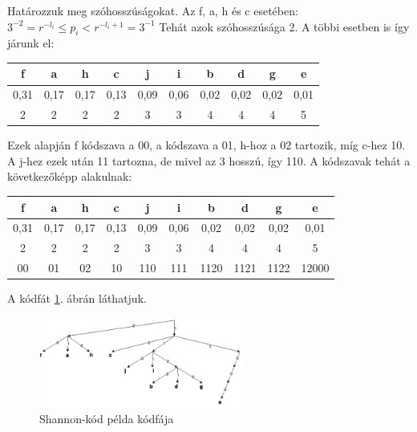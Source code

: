 \documentclass[margin=0px]{article}
\begin{document}
\begin{description}
					Határozzuk meg szóhosszúságokat. Az f, a, h és c esetében: $3^{-2} = r^{-l_i} \leq p_i < r^{-l_i+1} = 3^{-1} $ Tehát azok szóhosszúsága 2. A többi esetben is így járunk el:

					\begin{tabular}{|c|c|c|c|c|c|c|c|c|c|}
						\hline f & a & h & c & j & i & b & d & g & e \\ 
						\hline 0,31 & 0,17 & 0,17 & 0,13 & 0,09 & 0,06 & 0,02 & 0,02 & 0,02 & 0,01 \\ 
						\hline 2 & 2 & 2 & 2 & 3 & 3 & 4 & 4 & 4  & 5 \\
						\hline 
					\end{tabular}
					
					Ezek alapján f kódszava a 00, a kódszava a 01, h-hoz a 02 tartozik, míg c-hez 10. A j-hez ezek után 11 tartozna, de mivel az 3 hosszú, így 110.
					A kódszavak tehát a következőképp alakulnak:
					
					\begin{tabular}{|c|c|c|c|c|c|c|c|c|c|}
						\hline f & a & h & c & j & i & b & d & g & e \\ 
						\hline 0,31 & 0,17 & 0,17 & 0,13 & 0,09 & 0,06 & 0,02 & 0,02 & 0,02 & 0,01 \\ 
						\hline 2 & 2 & 2 & 2 & 3 & 3 & 4 & 4 & 4  & 5 \\
						\hline 00 & 01 & 02 & 10 & 110 & 111 & 1120 & 1121 & 1122 & 12000 \\
						\hline 
					\end{tabular}
					
					A kódfát \ref{fig:shannon}. ábrán láthatjuk.
					
					\begin{figure}[H]
						\centering
						\includegraphics[width=0.6\textwidth]{img/shannon.png}
						\caption{Shannon-kód példa kódfája}
						\label{fig:shannon}
					\end{figure}
					

\end{description}
\end{document}
